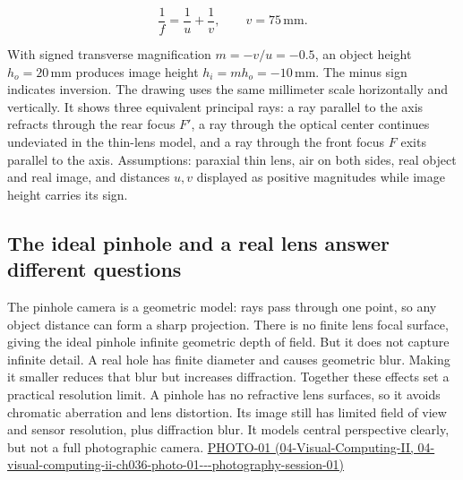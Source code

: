 \[
\frac{1}{f}=\frac{1}{u}+\frac{1}{v},\qquad v=75\,\mathrm{mm}.
\]

With signed transverse magnification \(m=-v/u=-0.5\), an object height \(h_o=20\,\mathrm{mm}\) produces image height \(h_i=mh_o=-10\,\mathrm{mm}\). The minus sign indicates inversion. The drawing uses the same millimeter scale horizontally and vertically. It shows three equivalent principal rays: a ray parallel to the axis refracts through the rear focus \(F'\), a ray through the optical center continues undeviated in the thin-lens model, and a ray through the front focus \(F\) exits parallel to the axis. Assumptions: paraxial thin lens, air on both sides, real object and real image, and distances \(u,v\) displayed as positive magnitudes while image height carries its sign.

\subsection{The ideal pinhole and a real lens answer different questions}\label{03-visual-computing-i-ch003-the-ideal-pinhole-and-a-real-lens-answer-different-questions}

The pinhole camera is a geometric model: rays pass through one point, so any object distance can form a sharp projection. There is no finite lens focal surface, giving the ideal pinhole infinite geometric depth of field. But it does not capture infinite detail. A real hole has finite diameter and causes geometric blur. Making it smaller reduces that blur but increases diffraction. Together these effects set a practical resolution limit. A pinhole has no refractive lens surfaces, so it avoids chromatic aberration and lens distortion. Its image still has limited field of view and sensor resolution, plus diffraction blur. It models central perspective clearly, but not a full photographic camera. \href{../04-Visual-Computing-II/main.pdf\#nameddest=04-visual-computing-ii-ch036-photo-01---photography-session-01}{PHOTO-01 (04-Visual-Computing-II, 04-visual-computing-ii-ch036-photo-01-\/-\/-photography-session-01)}

